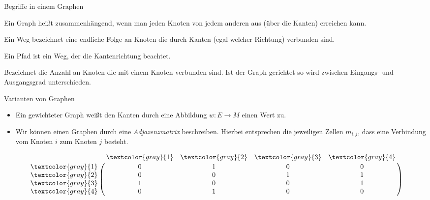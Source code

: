 \begin{frame}{Begriffe in einem Graphen}
    \pause{}
    \begin{description}[Zusammenhang]
        \item[Zusammenhang] Ein Graph heißt zusammenhängend, wenn man jeden Knoten von jedem anderen aus (über die Kanten) erreichen kann.\pause{}
        \item[Weg] Ein Weg bezeichnet eine endliche Folge an Knoten die durch Kanten (egal welcher Richtung) verbunden sind.\pause{}
        \item[Pfad] Ein Pfad ist ein Weg, der die Kantenrichtung beachtet.\pause{}
        \item[Grad] Bezeichnet die Anzahl an Knoten die mit einem Knoten verbunden sind.\pause{} Ist der Graph gerichtet so wird zwischen Eingangs- und Ausgangsgrad unterschieden.
    \end{description}
\end{frame}

\begin{frame}{Varianten von Graphen}
    \begin{itemize}[<+(1)->]
        \item Ein gewichteter Graph weißt den Kanten durch eine Abbildung \(w: E \to M\) einen Wert zu.
        \item Wir können einen Graphen durch eine \emph{Adjazenzmatrix} beschreiben.\pause{} Hierbei entsprechen die jeweiligen Zellen \(m_{i,j}\), dass eine Verbindung vom Knoten \(i\) zum Knoten \(j\) besteht.
    \end{itemize}
    \vfill\pause{}
    \begin{minipage}{0.45\linewidth}
\centering{}
    \end{minipage}\quad\begin{minipage}{0.45\linewidth}%
        \[\bordermatrix{~ & \textcolor{gray}{1} & \textcolor{gray}{2} & \textcolor{gray}{3} & \textcolor{gray}{4} \cr
        \textcolor{gray}{1} & 0 & 1 & 0 & 0\cr
        \textcolor{gray}{2} & 0 & 0 & 1 & 1\cr
        \textcolor{gray}{3} & 1 & 0 & 0 & 1\cr
        \textcolor{gray}{4} & 0 & 1 & 0 & 0\cr
        }\]
    \end{minipage}
\end{frame}

